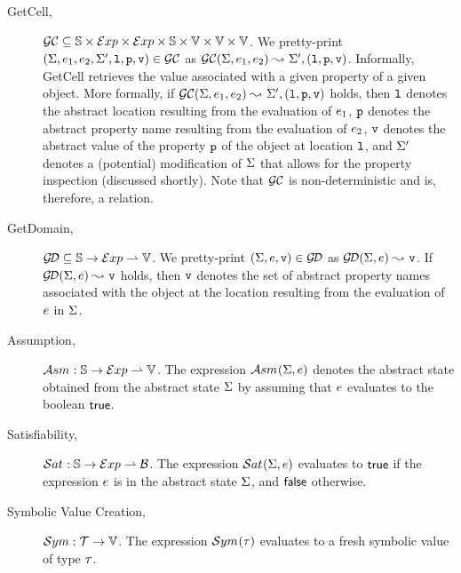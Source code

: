\begin{description}
  
  \item[GetCell,] $\mathcal{GC} \subseteq \mathbb{S} \times \mathcal{E}xp \times \mathcal{E}xp \times \mathbb{S} \times \mathbb{V} \times \mathbb{V} \times \mathbb{V}$. 
          We pretty-print $(\Sigma, e_1, e_2, \Sigma', \mathtt{l}, \mathtt{p}, \mathtt{v}) \in \mathcal{GC}$ as $\mathcal{GC}(\Sigma, e_1, e_2) \leadsto_{} \Sigma', (\mathtt{l}, \mathtt{p}, \mathtt{v})$. 
          Informally, GetCell retrieves the value associated with a given property of a given object. More formally, if $\mathcal{GC}(\Sigma, e_1, e_2) \leadsto_{} \Sigma', (\mathtt{l}, \mathtt{p}, \mathtt{v})$ holds, 
          then  $\mathtt{l}$ denotes the abstract location resulting from the evaluation of $e_1$, 
           $\mathtt{p}$ denotes the abstract property name resulting from the evaluation of $e_2$, 
           $\mathtt{v}$ denotes the abstract value of the property $\mathtt{p}$ of the object at location $\mathtt{l}$, 
          and  $\Sigma'$ denotes a (potential) modification of $\Sigma$ that allows for the property inspection (discussed shortly). 
          Note that $\mathcal{GC}$ is non-deterministic and is, therefore, a relation.
             
  \item[GetDomain,] $\mathcal{G\!D} \subseteq \mathbb{S} \rightarrow \mathcal{E}xp \rightharpoonup \mathbb{V}$. 
           We pretty-print $(\Sigma, e, \mathtt{v}) \in \mathcal{G\!D}$ as $\mathcal{G\!D}(\Sigma, e) \leadsto_{} \mathtt{v}$. 
           If $\mathcal{G\!D}(\Sigma, e) \leadsto_{} \mathtt{v}$ holds, then $\mathtt{v}$ denotes the 
           set of abstract property names associated with the object at the location resulting from the evaluation of $e$ 
           in $\Sigma$. 
   
   \item[Assumption,] $\mathcal{A}{sm}_{} : \mathbb{S} \rightarrow \mathcal{E}xp \rightharpoonup \mathbb{V}$. 
            The expression $\mathcal{A}{sm}_{}(\Sigma, e)$ denotes the abstract state obtained from the 
            abstract state $\Sigma$ by assuming that $e$ evaluates to the boolean ${\sf true}$. 
  
   \item[Satisfiability,] $\mathcal{S}at_{} : \mathbb{S} \rightarrow \mathcal{E}xp \rightharpoonup \mathcal{B}$. 
            The expression $\mathcal{S}at_{}(\Sigma, e)$ evaluates to ${\sf true}$ if the \jsil expression $e$ is  in the abstract 
            state $\Sigma$, and ${\sf false}$ otherwise.
             
   \item[Symbolic Value Creation,] $\mathcal{S}ym : \mathcal{T} \rightarrow \mathbb{V}$. 
            The expression $\mathcal{S}ym_{}(\tau)$ evaluates to a fresh symbolic value of type $\tau$.
\end{description}

